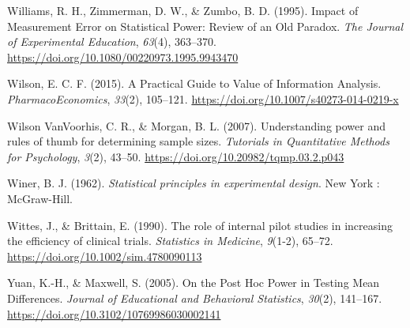 \documentclass[
  english,
  ,jou, a4paper,floatsintext]{apa6}
\newlength{\cslhangindent}
\newenvironment{cslreferences}%
  {\setlength{\parindent}{0pt}%
  \everypar{\setlength{\hangindent}{\cslhangindent}}\ignorespaces}%
  {\par}
\begin{document}
\begin{cslreferences}
\leavevmode\hypertarget{ref-williams_impact_1995}{}%
Williams, R. H., Zimmerman, D. W., \& Zumbo, B. D. (1995). Impact of Measurement Error on Statistical Power: Review of an Old Paradox. \emph{The Journal of Experimental Education}, \emph{63}(4), 363--370. \url{https://doi.org/10.1080/00220973.1995.9943470}

\leavevmode\hypertarget{ref-wilson_practical_2015}{}%
Wilson, E. C. F. (2015). A Practical Guide to Value of Information Analysis. \emph{PharmacoEconomics}, \emph{33}(2), 105--121. \url{https://doi.org/10.1007/s40273-014-0219-x}

\leavevmode\hypertarget{ref-wilson_vanvoorhis_understanding_2007}{}%
Wilson VanVoorhis, C. R., \& Morgan, B. L. (2007). Understanding power and rules of thumb for determining sample sizes. \emph{Tutorials in Quantitative Methods for Psychology}, \emph{3}(2), 43--50. \url{https://doi.org/10.20982/tqmp.03.2.p043}

\leavevmode\hypertarget{ref-winer_statistical_1962}{}%
Winer, B. J. (1962). \emph{Statistical principles in experimental design}. New York : McGraw-Hill.

\leavevmode\hypertarget{ref-wittes_role_1990}{}%
Wittes, J., \& Brittain, E. (1990). The role of internal pilot studies in increasing the efficiency of clinical trials. \emph{Statistics in Medicine}, \emph{9}(1-2), 65--72. \url{https://doi.org/10.1002/sim.4780090113}

\leavevmode\hypertarget{ref-yuan_post_2005}{}%
Yuan, K.-H., \& Maxwell, S. (2005). On the Post Hoc Power in Testing Mean Differences. \emph{Journal of Educational and Behavioral Statistics}, \emph{30}(2), 141--167. \url{https://doi.org/10.3102/10769986030002141}
\end{cslreferences}

\endgroup
\end{document}
